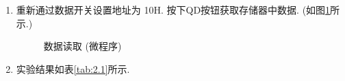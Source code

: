 \documentclass[../main.tex]{subfiles}
\begin{document}
\begin{enumerate}
    \item 重新通过数据开关设置地址为 10H. 按下QD按钮获取存储器中数据. (如图\ref{fig:2.2}所示.)

          \begin{figure}[p]
              \centering
              \caption{数据读取 (微程序)}
              \label{fig:2.2}
          \end{figure}

    \item 实验结果如表\ref{tab:2.1}所示.


\end{enumerate}
\end{document}
